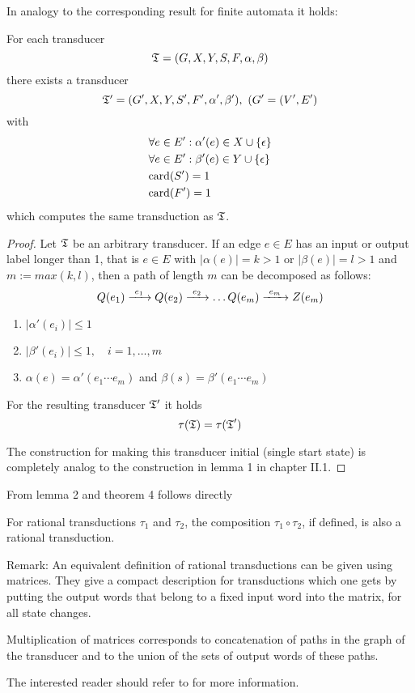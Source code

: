 In analogy to the corresponding result for finite automata it holds:

\begin{lemma}
For each transducer
\[ \mbox{$\mathfrak{T}$} = (G, X, Y, S, F, \alpha, \beta) \] there exists a
transducer
\[ \fa{T'} = (G', X, Y, S', F', \alpha', \beta'),\ (G'=(V', E') \] with
\begin{eqnarray*}
& \forall e \in E': \alpha'(e) \in X \cup \mbox{$\{\epsilon\}$} \\
& \forall e \in E': \beta'(e) \in Y \cup \mbox{$\{\epsilon\}$} \\
& \mathrm{card}({S'}) = 1 \\
& \mathrm{card}({F'}) = 1
\end{eqnarray*}
which computes the same transduction as $\mbox{$\mathfrak{T}$}$.
\end{lemma}

\begin{proof}
Let $\mbox{$\mathfrak{T}$}$ be an arbitrary transducer. If an edge $e \in E$ has an
input or output label longer than 1, that is $e \in E$ with $|\alpha(e)| = k >
1$ or $|\beta(e)| = l > 1$ and $m := max(k, l)$, then a path of length $m$ can
be decomposed as follows:
\[ Q(e_1) \xrightarrow{\ {e_1}\ } Q(e_2) \xrightarrow{\ {e_2}\ } \ldots Q(e_m) \xrightarrow{\ {e_m}\ } Z(e_m) \]

\begin{enumerate}
  \item $|\alpha'(e_i)| \leq 1$
  \item $|\beta'(e_i)| \leq 1,\quad i = 1,\ldots,m$
  \item $\alpha(e) = \alpha'(e_1 \cdots e_m)$ and $\beta(s) = \beta'(e_1
  \cdots e_m)$
\end{enumerate}

For the resulting transducer $\mbox{$\mathfrak{T'}$}$ it holds
\[ \tau(\mbox{$\mathfrak{T}$}) = \tau(\mbox{$\mathfrak{T}$}') \]

The construction for making this transducer initial (single start state) is
completely analog to the construction in lemma 1 in chapter II.1.
\end{proof}

From lemma 2 and theorem 4 follows directly

\begin{theorem}
For rational transductions $\tau_1$ and $\tau_2$, the composition 
$\tau_1 \circ \tau_2$, if defined, is also a rational transduction.
\end{theorem}

\medskip
Remark: An equivalent definition of rational transductions can be given using
matrices. They give a compact description for transductions which one gets by
putting the output words that belong to a fixed input word into the matrix, for
all state changes.

Multiplication of matrices corresponds to concatenation of paths in the graph of
the transducer and to the union of the sets of output words of these paths.

The interested reader should refer to \cite{Berstel79} for more information.
